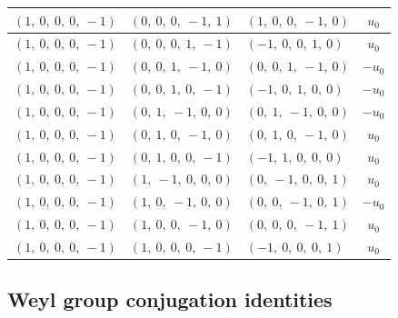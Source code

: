 \documentclass[11pt]{article}
\theoremstyle{definition}
\begin{document}
\begin{longtable}{|l|l|l|c|}
    \hline
    $\left( 1, \  0, \  0, \  0, \  -1\right)$ & $\left( 0, \  0, \  0, \  -1, \  1\right)$ & $\left( 1, \  0, \  0, \  -1, \  0\right)$ & $u_{0}$ \\
    \hline
    $\left( 1, \  0, \  0, \  0, \  -1\right)$ & $\left( 0, \  0, \  0, \  1, \  -1\right)$ & $\left( -1, \  0, \  0, \  1, \  0\right)$ & $u_{0}$ \\
    \hline
    $\left( 1, \  0, \  0, \  0, \  -1\right)$ & $\left( 0, \  0, \  1, \  -1, \  0\right)$ & $\left( 0, \  0, \  1, \  -1, \  0\right)$ & $- u_{0}$ \\
    \hline
    $\left( 1, \  0, \  0, \  0, \  -1\right)$ & $\left( 0, \  0, \  1, \  0, \  -1\right)$ & $\left( -1, \  0, \  1, \  0, \  0\right)$ & $- u_{0}$ \\
    \hline
    $\left( 1, \  0, \  0, \  0, \  -1\right)$ & $\left( 0, \  1, \  -1, \  0, \  0\right)$ & $\left( 0, \  1, \  -1, \  0, \  0\right)$ & $- u_{0}$ \\
    \hline
    $\left( 1, \  0, \  0, \  0, \  -1\right)$ & $\left( 0, \  1, \  0, \  -1, \  0\right)$ & $\left( 0, \  1, \  0, \  -1, \  0\right)$ & $u_{0}$ \\
    \hline
    $\left( 1, \  0, \  0, \  0, \  -1\right)$ & $\left( 0, \  1, \  0, \  0, \  -1\right)$ & $\left( -1, \  1, \  0, \  0, \  0\right)$ & $u_{0}$ \\
    \hline
    $\left( 1, \  0, \  0, \  0, \  -1\right)$ & $\left( 1, \  -1, \  0, \  0, \  0\right)$ & $\left( 0, \  -1, \  0, \  0, \  1\right)$ & $u_{0}$ \\
    \hline
    $\left( 1, \  0, \  0, \  0, \  -1\right)$ & $\left( 1, \  0, \  -1, \  0, \  0\right)$ & $\left( 0, \  0, \  -1, \  0, \  1\right)$ & $- u_{0}$ \\
    \hline
    $\left( 1, \  0, \  0, \  0, \  -1\right)$ & $\left( 1, \  0, \  0, \  -1, \  0\right)$ & $\left( 0, \  0, \  0, \  -1, \  1\right)$ & $u_{0}$ \\
    \hline
    $\left( 1, \  0, \  0, \  0, \  -1\right)$ & $\left( 1, \  0, \  0, \  0, \  -1\right)$ & $\left( -1, \  0, \  0, \  0, \  1\right)$ & $u_{0}$ \\
    \hline
\end{longtable}


\subsection{Weyl group conjugation identities}
\end{document}
